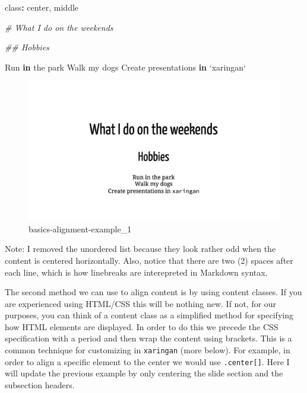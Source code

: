 \documentclass[
]{book}
\newenvironment{Shaded}{\begin{snugshade}}{\end{snugshade}}
\newcommand{\CommentTok}[1]{\textcolor[rgb]{0.37,0.37,0.37}{\textit{#1}}}
\newcommand{\ControlFlowTok}[1]{\textcolor[rgb]{0.27,0.27,0.27}{\textbf{#1}}}
\newcommand{\DataTypeTok}[1]{\textcolor[rgb]{0.27,0.27,0.27}{#1}}
\newcommand{\NormalTok}[1]{#1}
\newcommand{\OperatorTok}[1]{\textcolor[rgb]{0.43,0.43,0.43}{\textbf{#1}}}
\newcommand{\StringTok}[1]{\textcolor[rgb]{0.5,0.5,0.5}{#1}}
\begin{document}
\begin{Shaded}
\begin{Highlighting}[]
\NormalTok{class}\OperatorTok{:}\StringTok{ }\NormalTok{center, middle}

\CommentTok{# What I do on the weekends}

\CommentTok{## Hobbies}

\NormalTok{Run }\ControlFlowTok{in}\NormalTok{ the park  }
\NormalTok{Walk my dogs  }
\NormalTok{Create presentations }\ControlFlowTok{in} \StringTok{`}\DataTypeTok{xaringan}\StringTok{`}
\end{Highlighting}
\end{Shaded}

\begin{figure}
\centering
\includegraphics{img/02_basics-alignment-example_1.png}
\caption{basics-alignment-example\_1}
\end{figure}

Note: I removed the unordered list because they look rather odd when the content is centered horizontally. Also, notice that there are two (2) spaces after each line, which is how linebreaks are interepreted in Markdown syntax.

The second method we can use to align content is by using content classes. If you are experienced using HTML/CSS this will be nothing new. If not, for our purposes, you can think of a content class as a simplified method for specifying how HTML elements are displayed. In order to do this we precede the CSS specification with a period and then wrap the content using brackets. This is a common technique for customizing in \texttt{xaringan} (more below). For example, in order to align a specific element to the center we would use \texttt{.center{[}{]}}. Here I will update the previous example by only centering the slide section and the subsection headers.
\end{document}

